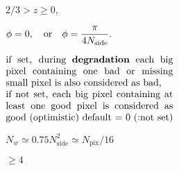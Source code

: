 \documentclass[12pt,twoside]{article}
\providecommand{\facname}{}%
\providecommand{\FACNAME}{}%
\def\lthtmlcheckvsize{\ifdim\ht\sizebox<\vsize 
  \ifdim\wd\sizebox<\hsize\expandafter\hfill\fi \expandafter\vfill
  \else\expandafter\vss\fi}%
\begin{document}
{\newpage\clearpage
{}%
$\displaystyle %
     2/3 > z \geq 0,$%
\lthtmlindisplaymathZ
\lthtmlcheckvsize\clearpage}

{\newpage\clearpage
{}%
$\displaystyle \phi=0, \quad{\rm or}\quad  \phi=\frac{\pi}{4N_{\mathrm{side}}}.%
$%
\lthtmlindisplaymathZ
\lthtmlcheckvsize\clearpage}


\renewcommand{\facname}{{ud\_grade}}

\renewcommand{\FACNAME}{{UD\_GRADE}}
{\newpage\clearpage
{}%
$\textstyle \parbox{0.5\hsize}{if set, during {\bf degradation} each big pixel containing one
    bad or missing small pixel is also considered as bad, \\
        if not set, each big pixel containing at least one good pixel
    is considered as good (optimistic)
       default = 0 (:not set)}$%
\lthtmlindisplaymathZ
\lthtmlcheckvsize\clearpage}


\renewcommand{\facname}{{unfold\_weights }}

\renewcommand{\FACNAME}{{UNFOLD\_WEIGHTS }}
{\newpage\clearpage
{}%
$N_w \simeq 0.75 N_{\mathrm{side}}^2 \simeq N_{\mathrm{pix}}/16$%
\lthtmlindisplaymathZ
\lthtmlcheckvsize\clearpage}

{\newpage\clearpage
{}%
$\ge 4$%
\lthtmlindisplaymathZ
\lthtmlcheckvsize\clearpage}


\renewcommand{\facname}{{vec2ang }}

\renewcommand{\FACNAME}{{VEC2ANG }}

\renewcommand{\facname}{{write\_fits\_cut4 }}

\renewcommand{\FACNAME}{{WRITE\_FITS\_CUT4 }}

\renewcommand{\facname}{{write\_fits\_map}}

\renewcommand{\FACNAME}{{WRITE\_FITS\_MAP}}

\renewcommand{\facname}{{write\_fits\_sb}}
\end{document}
